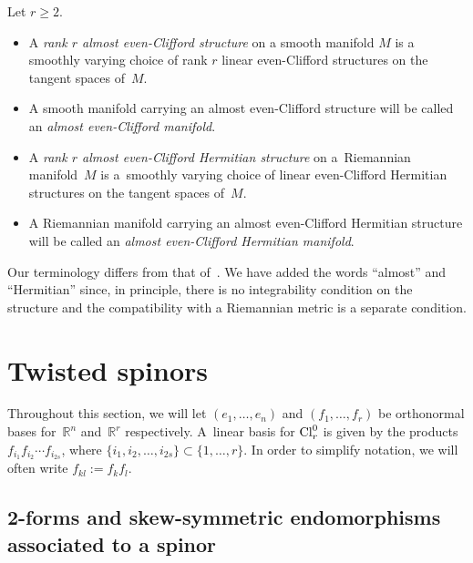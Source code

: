 \documentclass[pdftex]{sigma}
\numberwithin{equation}{section}
\begin{document}
\begin{Definition} Let $r\geq 2$.
\begin{itemize}\itemsep=0pt
\item A {\em rank $r$ almost even-Clifford structure} on a smooth manifold $M$ is a smoothly varying choice of rank $r$ linear even-Clifford structures on the tangent spaces of~$M$.
\item A smooth manifold carrying an almost even-Clifford structure will be called an {\em almost even-Clifford manifold}.
\item A {\em rank $r$ almost even-Clifford Hermitian structure} on a~Riemannian manifold~$M$ is a~smoo\-th\-ly varying choice of linear even-Clifford Hermitian structures on the tangent spaces of~$M$.
\item A Riemannian manifold carrying an almost even-Clifford Hermitian structure will be called an {\em almost even-Clifford Hermitian manifold}.
\end{itemize}
\end{Definition}

\begin{Remark} Our terminology differs from that of~\cite{Moroianu-Semmelmann}. We have added the words ``almost'' and ``Hermitian'' since, in principle, there is no integrability condition on the structure and the compatibility with a Riemannian metric is a separate condition.
\end{Remark}

\section{Twisted spinors}\label{sec:algebraic-setup}

Throughout this section, we will let $(e_1,\dots, e_n)$ and $(f_1,\dots, f_r)$ be orthonormal bases for~$\mathbb{R}^n$ and~$\mathbb{R}^r$ respectively. A~linear basis for ${\rm Cl}_r^0$ is given by the products $f_{i_1}f_{i_2}\cdots f_{i_{2s}}$, where $\{i_1,i_2,\dots,i_{2s}\}\subset \{1,\dots , r\}$. In order to simplify notation, we will often write
$f_{kl}:=f_kf_l$.

\subsection{2-forms and skew-symmetric endomorphisms associated to a spinor}
\end{document}
